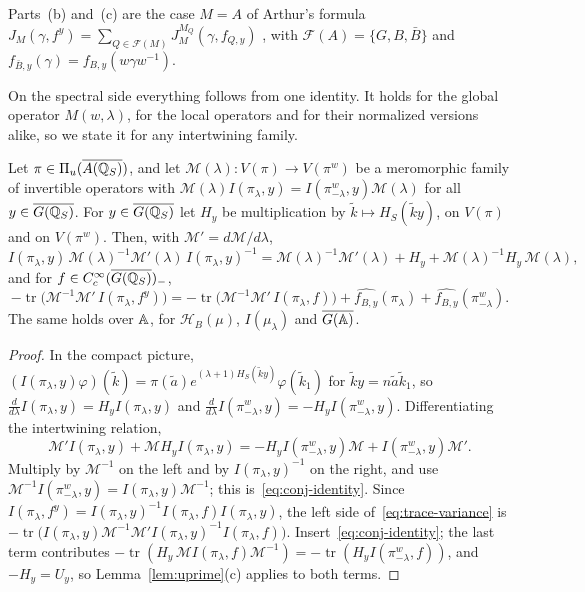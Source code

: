 Parts~(b) and~(c) are the case $M=A$ of Arthur's formula
$J_M(\gamma,f^y)=\sum_{Q\in\mathcal F(M)}J_M^{M_Q}(\gamma,f_{Q,y})$
\cite{Ar81,Ar88b}, with $\mathcal F(A)=\{G,B,\bar B\}$ and
$f_{\bar B,y}(\gamma)=f_{B,y}(w\gamma w^{-1})$.

On the spectral side everything follows from one identity. It holds for
the global operator $M(w,\lambda)$, for the local operators and for their
normalized versions alike, so we state it for any intertwining family.

\begin{lemma}\label{lem:conj-identity}
Let $\pi\in\Pi_u(\overline{A(\mathbb{Q}_S)})$, and let $\mathcal M(\lambda)\colon V(\pi)\to
V(\pi^w)$ be a meromorphic family of invertible operators with
$\mathcal M(\lambda)I(\pi_\lambda,y)=I(\pi^w_{-\lambda},y)\mathcal
M(\lambda)$ for all $y\in\overline{G(\mathbb{Q}_S)}$. For $y\in\overline{G(\mathbb{Q}_S)}$ let $H_y$ be multiplication
by $\tilde k\mapsto H_S(\tilde ky)$, on $V(\pi)$ and on $V(\pi^w)$. Then,
with $\mathcal M'=d\mathcal M/d\lambda$,
\begin{equation}\label{eq:conj-identity}
I(\pi_\lambda,y)\,\mathcal M(\lambda)^{-1}\mathcal M'(\lambda)\,
I(\pi_\lambda,y)^{-1}=\mathcal M(\lambda)^{-1}\mathcal M'(\lambda)+H_y
+\mathcal M(\lambda)^{-1}H_y\,\mathcal M(\lambda),
\end{equation}
and for $f\in C_c^\infty(\overline{G(\mathbb{Q}_S)})_-$,
\begin{equation}\label{eq:trace-variance}
-\operatorname{tr}\bigl(\mathcal M^{-1}\mathcal M'\,I(\pi_\lambda,f^y)\bigr)
=-\operatorname{tr}\bigl(\mathcal M^{-1}\mathcal M'\,I(\pi_\lambda,f)\bigr)
+\widehat{f_{B,y}}(\pi_\lambda)+\widehat{f_{B,y}}(\pi^w_{-\lambda}).
\end{equation}
The same holds over $\mathbb{A}$, for $\mathcal H_B(\mu)$, $I(\mu_\lambda)$ and
$\overline{G(\mathbb{A})}$.
\end{lemma}

\begin{proof}
In the compact picture, $(I(\pi_\lambda,y)\varphi)(\tilde k)=\pi(\tilde
a)e^{(\lambda+1)H_S(\tilde ky)}\varphi(\tilde k_1)$ for $\tilde
ky=n\tilde a\tilde k_1$, so $\frac{d}{d\lambda}I(\pi_\lambda,y)=H_y
I(\pi_\lambda,y)$ and $\frac{d}{d\lambda}I(\pi^w_{-\lambda},y)=-H_y
I(\pi^w_{-\lambda},y)$. Differentiating the intertwining relation,
\[
\mathcal M'I(\pi_\lambda,y)+\mathcal MH_yI(\pi_\lambda,y)
=-H_yI(\pi^w_{-\lambda},y)\mathcal M+I(\pi^w_{-\lambda},y)\mathcal M'.
\]
Multiply by $\mathcal M^{-1}$ on the left and by $I(\pi_\lambda,y)^{-1}$
on the right, and use $\mathcal M^{-1}I(\pi^w_{-\lambda},y)=I(\pi_\lambda,
y)\mathcal M^{-1}$; this is~\eqref{eq:conj-identity}. Since
$I(\pi_\lambda,f^y)=I(\pi_\lambda,y)^{-1}I(\pi_\lambda,f)I(\pi_\lambda,y)$,
the left side of~\eqref{eq:trace-variance} is $-\operatorname{tr}\bigl(
I(\pi_\lambda,y)\mathcal M^{-1}\mathcal M'I(\pi_\lambda,y)^{-1}
I(\pi_\lambda,f)\bigr)$. Insert~\eqref{eq:conj-identity}; the last term
contributes $-\operatorname{tr}(H_y\,\mathcal MI(\pi_\lambda,f)\mathcal
M^{-1})=-\operatorname{tr}(H_yI(\pi^w_{-\lambda},f))$, and $-H_y=U_y$, so
Lemma~\ref{lem:uprime}(c) applies to both terms.
\end{proof}

